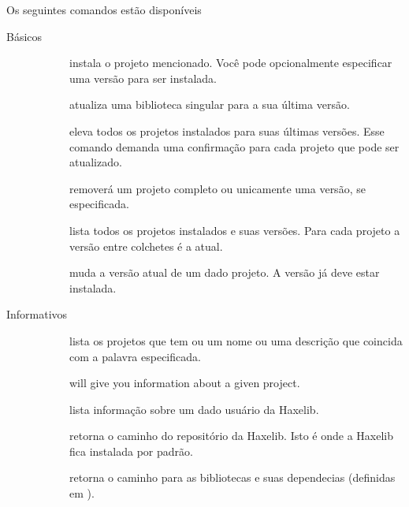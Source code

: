 {Os seguintes comandos estão disponíveis

\begin{description}
	\item[Básicos]
		\begin{description}
			\item[] instala o projeto mencionado. Você pode opcionalmente especificar uma versão para ser instalada.
			\item[] atualiza uma biblioteca singular para a sua última versão. 
			\item[] eleva todos os projetos instalados para suas últimas versões. Esse comando demanda uma confirmação para cada projeto que pode ser atualizado.
			\item[] removerá um projeto completo ou unicamente uma versão, se especificada.
			\item[] lista todos os projetos instalados e suas versões. Para cada projeto a versão entre colchetes é a atual.
			\item[] muda a versão atual de um dado projeto. A versão já deve estar instalada.
		\end{description}
		
	\item[Informativos]
		\begin{description}
			\item[] lista os projetos que tem ou um nome ou uma descrição que coincida com a palavra especificada.
			\item[] will give you information about a given project.
			\item[] lista informação sobre um dado usuário da  Haxelib.
			\item[] retorna o caminho do repositório da Haxelib. Isto é onde a Haxelib fica instalada por padrão.
			\item[] retorna o caminho para as bibliotecas e suas dependecias (definidas em ).
		\end{description}
		

\end{description}}
